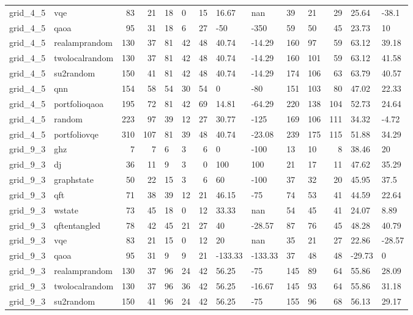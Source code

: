\begin{longtable}{llrrllrllllrll}
grid\_4\_5 & vqe & 83 & 21 & 18 & 0 & 15 & 16.67 & nan & 39 & 21 & 29 & 25.64 & -38.1 \\
grid\_4\_5 & qaoa & 95 & 31 & 18 & 6 & 27 & -50 & -350 & 59 & 50 & 45 & 23.73 & 10 \\
grid\_4\_5 & realamprandom & 130 & 37 & 81 & 42 & 48 & 40.74 & -14.29 & 160 & 97 & 59 & 63.12 & 39.18 \\
grid\_4\_5 & twolocalrandom & 130 & 37 & 81 & 42 & 48 & 40.74 & -14.29 & 160 & 101 & 59 & 63.12 & 41.58 \\
grid\_4\_5 & su2random & 150 & 41 & 81 & 42 & 48 & 40.74 & -14.29 & 174 & 106 & 63 & 63.79 & 40.57 \\
grid\_4\_5 & qnn & 154 & 58 & 54 & 30 & 54 & 0 & -80 & 151 & 103 & 80 & 47.02 & 22.33 \\
grid\_4\_5 & portfolioqaoa & 195 & 72 & 81 & 42 & 69 & 14.81 & -64.29 & 220 & 138 & 104 & 52.73 & 24.64 \\
grid\_4\_5 & random & 223 & 97 & 39 & 12 & 27 & 30.77 & -125 & 169 & 106 & 111 & 34.32 & -4.72 \\
grid\_4\_5 & portfoliovqe & 310 & 107 & 81 & 39 & 48 & 40.74 & -23.08 & 239 & 175 & 115 & 51.88 & 34.29 \\
grid\_9\_3 & ghz & 7 & 7 & 6 & 3 & 6 & 0 & -100 & 13 & 10 & 8 & 38.46 & 20 \\
grid\_9\_3 & dj & 36 & 11 & 9 & 3 & 0 & 100 & 100 & 21 & 17 & 11 & 47.62 & 35.29 \\
grid\_9\_3 & graphstate & 50 & 22 & 15 & 3 & 6 & 60 & -100 & 37 & 32 & 20 & 45.95 & 37.5 \\
grid\_9\_3 & qft & 71 & 38 & 39 & 12 & 21 & 46.15 & -75 & 74 & 53 & 41 & 44.59 & 22.64 \\
grid\_9\_3 & wstate & 73 & 45 & 18 & 0 & 12 & 33.33 & nan & 54 & 45 & 41 & 24.07 & 8.89 \\
grid\_9\_3 & qftentangled & 78 & 42 & 45 & 21 & 27 & 40 & -28.57 & 87 & 76 & 45 & 48.28 & 40.79 \\
grid\_9\_3 & vqe & 83 & 21 & 15 & 0 & 12 & 20 & nan & 35 & 21 & 27 & 22.86 & -28.57 \\
grid\_9\_3 & qaoa & 95 & 31 & 9 & 9 & 21 & -133.33 & -133.33 & 37 & 48 & 48 & -29.73 & 0 \\
grid\_9\_3 & realamprandom & 130 & 37 & 96 & 24 & 42 & 56.25 & -75 & 145 & 89 & 64 & 55.86 & 28.09 \\
grid\_9\_3 & twolocalrandom & 130 & 37 & 96 & 36 & 42 & 56.25 & -16.67 & 145 & 93 & 64 & 55.86 & 31.18 \\
grid\_9\_3 & su2random & 150 & 41 & 96 & 24 & 42 & 56.25 & -75 & 155 & 96 & 68 & 56.13 & 29.17 \\

\end{longtable}
